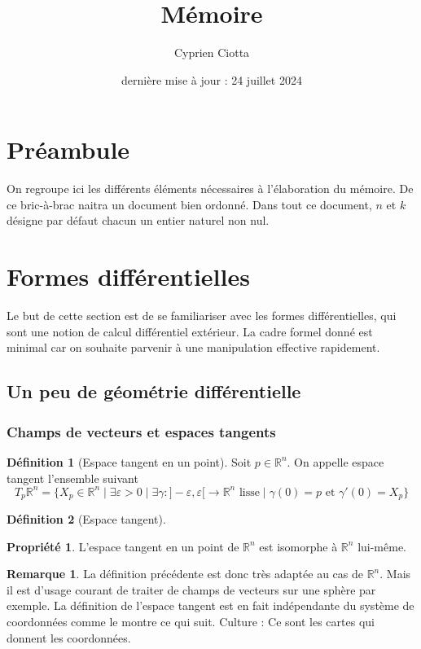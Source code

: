 \documentclass{article}
\title{Mémoire}
\author{Cyprien Ciotta}
\date{dernière mise à jour : 24 juillet 2024}
\newcommand{\R}{\mathbb{R}} %
\theoremstyle{definition} %
\newtheorem{defi}{Définition}
\newtheorem{rmq}{Remarque}
\newtheorem{propri}{Propriété}
\newcommand{\1}{\mathbb{1}} %
\begin{document}
\maketitle

\section{Préambule}
On regroupe ici les différents éléments nécessaires à l'élaboration du mémoire. 
De ce bric-à-brac naitra un document bien ordonné.
Dans tout ce document, $n$ et $k$ désigne par défaut chacun un entier naturel non nul.



\section{Formes différentielles}
Le but de cette section est de se familiariser avec les formes différentielles, qui sont une notion de calcul différentiel extérieur.
La cadre formel donné est minimal car on souhaite parvenir à une manipulation effective rapidement.

\subsection{Un peu de géométrie différentielle}

\subsubsection{Champs de vecteurs et espaces tangents}

\begin{defi}[Espace tangent en un point]
Soit $p \in \R^n$. On appelle espace tangent l'ensemble suivant
$$T_p\R^n = \{X_p \in \R^n \mid \exists \varepsilon >0 \mid \exists \gamma : ]-\varepsilon,\varepsilon[ \to \R^n \text{ lisse} \mid \gamma(0) = p \text{ et }\gamma'(0) = X_p \}$$
\end{defi}

\begin{defi}[Espace tangent]
\end{defi}

\begin{propri}
L'espace tangent en un point de $\R^n$ est isomorphe à $\R^n$ lui-même.
\end{propri}

\begin{rmq}
La définition précédente est donc très adaptée au cas de $\R^n$. Mais il est d'usage courant de traiter de champs de vecteurs sur une sphère par exemple. La définition de l'espace tangent est en fait indépendante du système de coordonnées comme le montre ce qui suit. Culture : Ce sont les cartes qui donnent les coordonnées.
\end{rmq}
\end{document}

